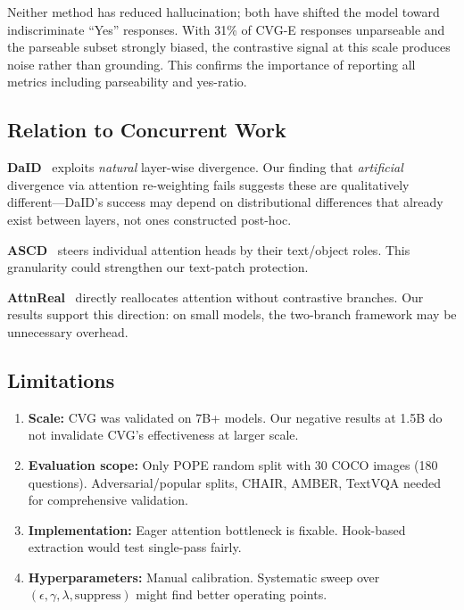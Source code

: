 \documentclass[10pt,twocolumn]{article}
\begin{document}
Neither method has reduced hallucination; both have shifted the model toward indiscriminate ``Yes'' responses. With 31\% of CVG-E responses unparseable and the parseable subset strongly biased, the contrastive signal at this scale produces noise rather than grounding. This confirms the importance of reporting all metrics including parseability and yes-ratio.

\subsection{Relation to Concurrent Work}

\textbf{DaID}~\cite{daid2025} exploits \emph{natural} layer-wise divergence. Our finding that \emph{artificial} divergence via attention re-weighting fails suggests these are qualitatively different---DaID's success may depend on distributional differences that already exist between layers, not ones constructed post-hoc.

\textbf{ASCD}~\cite{ascd} steers individual attention heads by their text/object roles. This granularity could strengthen our text-patch protection.

\textbf{AttnReal}~\cite{attnreal} directly reallocates attention without contrastive branches. Our results support this direction: on small models, the two-branch framework may be unnecessary overhead.

\subsection{Limitations}

\begin{enumerate}
\item \textbf{Scale:} CVG was validated on 7B+ models. Our negative results at 1.5B do not invalidate CVG's effectiveness at larger scale.
\item \textbf{Evaluation scope:} Only POPE random split with 30 COCO images (180 questions). Adversarial/popular splits, CHAIR, AMBER, TextVQA needed for comprehensive validation.
\item \textbf{Implementation:} Eager attention bottleneck is fixable. Hook-based extraction would test single-pass fairly.
\item \textbf{Hyperparameters:} Manual calibration. Systematic sweep over $(\epsilon, \gamma, \lambda, \text{suppress})$ might find better operating points.
\end{enumerate}

\end{document}
